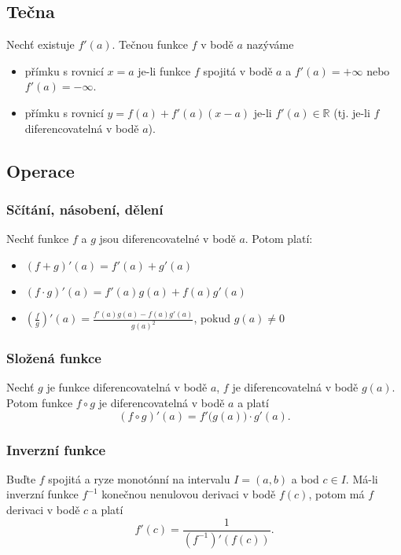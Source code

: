 \documentclass{szzclass}
\begin{document}
\subsection{Tečna}
Nechť existuje $f'(a)$. Tečnou funkce $f$ v bodě $a$ nazýváme
\begin{itemize}
    \item přímku s rovnicí $x=a$ je-li funkce $f$ spojitá v bodě $a$ a $f'(a) = +\infty$ nebo $f'(a) = -\infty$.
    \item přímku s rovnicí $y = f(a) +  f'(a) (x-a)$ je-li $f'(a) \in\mathbb{R}$ (tj. je-li $f$ diferencovatelná v bodě $a$).
\end{itemize}

\newpage

\subsection{Operace}
\subsubsection{Sčítání, násobení, dělení}
Nechť funkce $f$ a $g$ jsou diferencovatelné v bodě $a$. Potom platí:
\begin{itemize}
    \item $(f+g)'(a) = f'(a) + g'(a)$
    \item $(f\cdot g)'(a) = f'(a) g(a) + f(a) g'(a)$
    \item $\displaystyle\left(\frac{f}{g}\right)'(a) = \frac{f'(a)g(a) - f(a)g'(a)}{g(a)^2}$, pokud $g(a) \neq 0$
\end{itemize}

\subsubsection{Složená funkce}
Nechť $g$ je funkce diferencovatelná v bodě $a$,
$f$ je diferencovatelná v bodě $g(a)$.
Potom funkce $f \circ g$ je diferencovatelná v bodě $a$
a platí
\begin{equation*}
(f \circ g)'(a) = f'\big( g(a) \big) \cdot g'(a).\end{equation*}

\subsubsection{Inverzní funkce}
Buďte $f$ spojitá a ryze monotónní na intervalu
$I=(a,b)$ a bod $c \in I$. Má-li inverzní funkce
$f^{−1}$ konečnou nenulovou derivaci v bodě $f(c)$,
potom má $f$ derivaci v bodě $c$ a platí
\begin{equation*}
f'(c) = \frac{1}{(f^{-1})'(f(c))}.\end{equation*}
\end{document}
